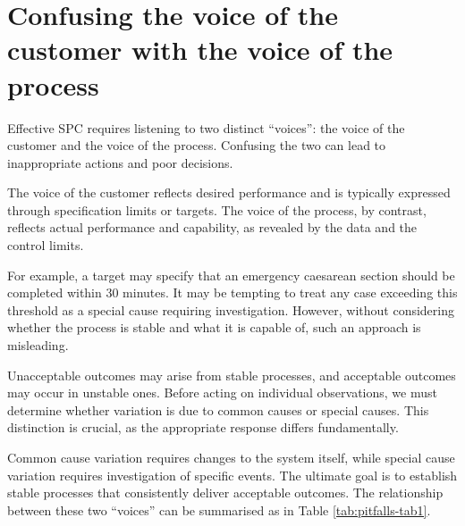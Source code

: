 \documentclass[
]{book}
\begin{document}
\section{Confusing the voice of the customer with the voice of the process}\label{confusing-the-voice-of-the-customer-with-the-voice-of-the-process}

Effective SPC requires listening to two distinct ``voices'': the voice of the customer and the voice of the process. Confusing the two can lead to inappropriate actions and poor decisions.

The voice of the customer reflects desired performance and is typically expressed through specification limits or targets. The voice of the process, by contrast, reflects actual performance and capability, as revealed by the data and the control limits.

For example, a target may specify that an emergency caesarean section should be completed within 30 minutes. It may be tempting to treat any case exceeding this threshold as a special cause requiring investigation. However, without considering whether the process is stable and what it is capable of, such an approach is misleading.

Unacceptable outcomes may arise from stable processes, and acceptable outcomes may occur in unstable ones. Before acting on individual observations, we must determine whether variation is due to common causes or special causes. This distinction is crucial, as the appropriate response differs fundamentally.

Common cause variation requires changes to the system itself, while special cause variation requires investigation of specific events. The ultimate goal is to establish stable processes that consistently deliver acceptable outcomes.
The relationship between these two ``voices'' can be summarised as in Table \ref{tab:pitfalls-tab1}.
\end{document}
